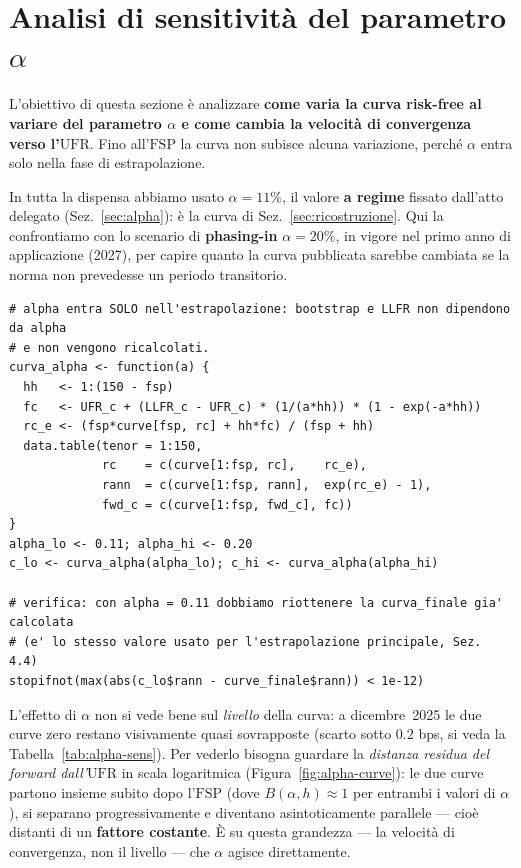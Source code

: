 \documentclass[11pt,a4paper]{article}
\theoremstyle{plain}
\theoremstyle{definition}
\theoremstyle{remark}
\newcommand{\UFR}{\mathrm{UFR}}
\newcommand{\FSP}{\mathrm{FSP}}
\begin{document}
\section{Analisi di sensitivit\`a del parametro \texorpdfstring{$\alpha$}{alpha}}
\label{sec:sens-alpha}

L'obiettivo di questa sezione \`e analizzare \textbf{come varia la curva risk-free al variare
del parametro $\alpha$ e come cambia la velocit\`a di convergenza verso l'$\UFR$}. Fino
all'$\FSP$ la curva non subisce alcuna variazione, perch\'e $\alpha$ entra solo nella fase di
estrapolazione.

In tutta la dispensa abbiamo usato $\alpha=11\%$, il valore \textbf{a regime} fissato
dall'atto delegato (Sez.~\ref{sec:alpha}): \`e la curva di Sez.~\ref{sec:ricostruzione}.
Qui la confrontiamo con lo scenario di \textbf{phasing-in} $\alpha=20\%$, in vigore nel primo
anno di applicazione (2027), per capire quanto la curva pubblicata sarebbe cambiata se la
norma non prevedesse un periodo transitorio.

\begin{codebox}
\begin{Verbatim}[fontsize=\small]
# alpha entra SOLO nell'estrapolazione: bootstrap e LLFR non dipendono da alpha
# e non vengono ricalcolati.
curva_alpha <- function(a) {
  hh   <- 1:(150 - fsp)
  fc   <- UFR_c + (LLFR_c - UFR_c) * (1/(a*hh)) * (1 - exp(-a*hh))
  rc_e <- (fsp*curve[fsp, rc] + hh*fc) / (fsp + hh)
  data.table(tenor = 1:150,
             rc    = c(curve[1:fsp, rc],    rc_e),
             rann  = c(curve[1:fsp, rann],  exp(rc_e) - 1),
             fwd_c = c(curve[1:fsp, fwd_c], fc))
}
alpha_lo <- 0.11; alpha_hi <- 0.20
c_lo <- curva_alpha(alpha_lo); c_hi <- curva_alpha(alpha_hi)

# verifica: con alpha = 0.11 dobbiamo riottenere la curva_finale gia' calcolata
# (e' lo stesso valore usato per l'estrapolazione principale, Sez. 4.4)
stopifnot(max(abs(c_lo$rann - curve_finale$rann)) < 1e-12)
\end{Verbatim}
\end{codebox}

L'effetto di $\alpha$ non si vede bene sul \emph{livello} della curva: a dicembre~2025 le due
curve zero restano visivamente quasi sovrapposte (scarto sotto $0.2$ bps, si veda la
Tabella~\ref{tab:alpha-sens}). Per vederlo bisogna guardare la \emph{distanza residua del
forward dall'$\UFR$} in scala logaritmica (Figura~\ref{fig:alpha-curve}): le due curve
partono insieme subito dopo l'$\FSP$ (dove $B(\alpha,h)\approx1$ per entrambi i valori di
$\alpha$), si separano progressivamente e diventano asintoticamente parallele --- cio\`e
distanti di un \textbf{fattore costante}. \`E su questa grandezza --- la velocit\`a di
convergenza, non il livello --- che $\alpha$ agisce direttamente.
\end{document}
